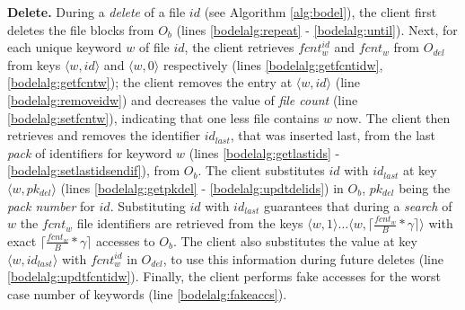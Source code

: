 \documentclass[sigconf]{acmart}
\newcommand{\pair}[2]{{\langle \ensuremath{#1, #2} \rangle}}
\newcommand{\ceil}[1]{\lceil #1 \rceil}
\begin{document}
\noindent\textbf{Delete.}
During a \emph{delete} of a file $id$ (see Algorithm \ref{alg:bodel}), the client first deletes the file blocks from $O_{b}$ (lines \ref{bodelalg:repeat} - \ref{bodelalg:until}). Next, for each unique keyword $w$ of file $id$, the client retrieves $fcnt_w^{id}$ and $fcnt_w$ from $O_{del}$ from keys $\pair{w}{id}$ and $\pair{w}{0}$  respectively (lines \ref{bodelalg:getfcntidw}, \ref{bodelalg:getfcntw}); the client removes the entry at $\pair{w}{id}$ (line \ref{bodelalg:removeidw}) and decreases the value of \emph{file count} (line \ref{bodelalg:setfcntw}), indicating that one less file contains $w$ now. The client then retrieves and removes the identifier $id_{last}$, that was inserted last, from the last \emph{pack} of identifiers for keyword $w$ (lines \ref{bodelalg:getlastids} - \ref{bodelalg:setlastidsendif}), from $O_{b}$. The client substitutes $id$ with $id_{last}$ at key $\pair{w}{pk_{del}}$ (lines \ref{bodelalg:getpkdel} - \ref{bodelalg:updtdelids}) in $O_{b}$, $pk_{del}$ being the \emph{pack number} for $id$. Substituting $id$ with $id_{last}$ guarantees that during a \emph{search} of $w$ the $fcnt_w$ file identifiers are retrieved from the keys $\pair{w}{1}\ldots \pair{w}{\ceil{\frac{fcnt_w}{B}*\gamma}}$ with exact ${\ceil{\frac{fcnt_w}{B}*\gamma}}$ accesses to $O_{b}$. The client also substitutes the value at key $\pair{w}{id_{last}}$ with $fcnt_w^{id}$ in $O_{del}$, to use this information during future deletes (line \ref{bodelalg:updtfcntidw}). Finally, the client performs fake accesses for the worst case number of keywords (line \ref{bodelalg:fakeaccs}).
\end{document}
